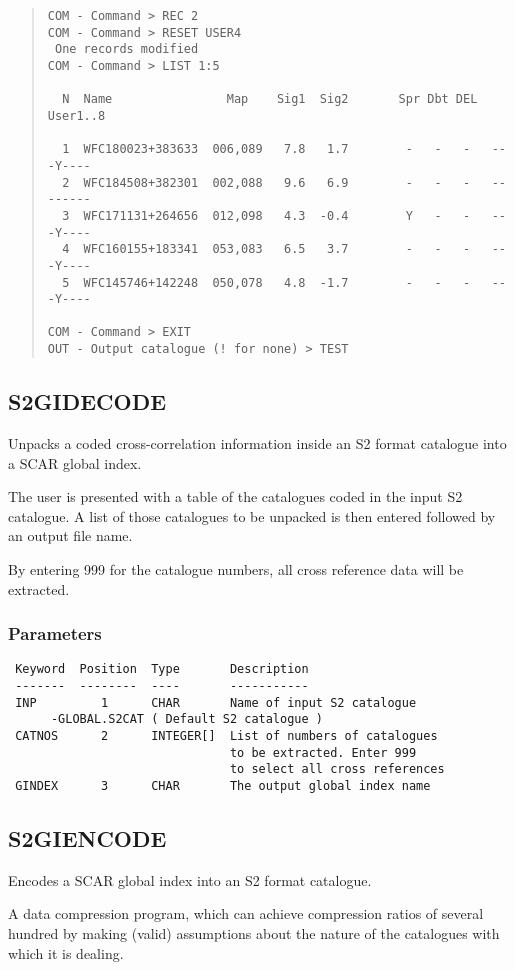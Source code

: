 \documentclass{book}
\renewcommand{\_}{{\tt\char'137}}     %
\begin{document}
\begin{quote}
\begin{verbatim}
COM - Command > REC 2
COM - Command > RESET USER4
 One records modified
COM - Command > LIST 1:5

  N  Name                Map    Sig1  Sig2       Spr Dbt DEL  User1..8

  1  WFC180023+383633  006,089   7.8   1.7        -   -   -   ---Y----
  2  WFC184508+382301  002,088   9.6   6.9        -   -   -   --------
  3  WFC171131+264656  012,098   4.3  -0.4        Y   -   -   ---Y----
  4  WFC160155+183341  053,083   6.5   3.7        -   -   -   ---Y----
  5  WFC145746+142248  050,078   4.8  -1.7        -   -   -   ---Y----

COM - Command > EXIT
OUT - Output catalogue (! for none) > TEST
\end{verbatim}\end{quote}
\subsection{S2GIDECODE}
Unpacks a coded cross-correlation information inside an S2
format catalogue into a SCAR global index.

The user is presented with a table of the catalogues coded
in the input S2 catalogue. A list of those catalogues to be
unpacked is then entered followed by an output file name.

By entering 999 for the catalogue numbers, all cross reference
data will be extracted.

\subsubsection{Parameters}
\begin{verbatim}
 Keyword  Position  Type       Description
 -------  --------  ----       -----------
 INP         1      CHAR       Name of input S2 catalogue
      -GLOBAL.S2CAT ( Default S2 catalogue )
 CATNOS      2      INTEGER[]  List of numbers of catalogues
                               to be extracted. Enter 999
                               to select all cross references
 GINDEX      3      CHAR       The output global index name
\end{verbatim}\subsection{S2GIENCODE}
Encodes a SCAR global index into an S2 format catalogue.

A data compression program, which can achieve compression
ratios of several hundred by making (valid) assumptions
about the nature of the catalogues with which it is dealing.
\end{document}
